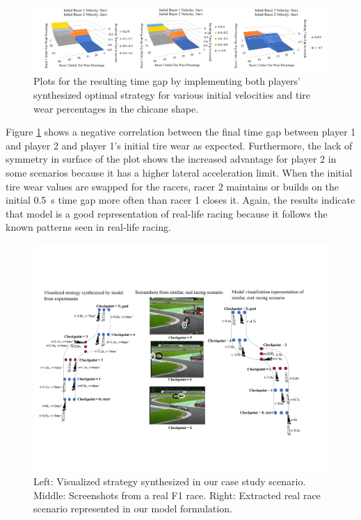  \begin{figure}[t!]
\includegraphics[width=\textwidth]{Figures/ChicaneExp.pdf}
    \caption[Results of scenarios in chicane case study.] {Plots for the resulting time gap by implementing both players' synthesized optimal strategy for various initial velocities and tire wear percentages in the chicane shape.}
    \label{fig:ch_exp}
\end{figure}
 
 Figure \ref{fig:ch_exp} shows a negative correlation between the final time gap between player 1 and player 2 and player 1's initial tire wear as expected. Furthermore, the lack of symmetry in surface of the plot shows the increased advantage for player 2 in some scenarios because it has a higher lateral acceleration limit. When the initial tire wear values are swapped for the racers, racer 2 maintains or builds on the initial \SI{0.5}{\second} time gap more often than racer 1 closes it. Again, the results indicate that model is a good representation of real-life racing because it follows the known patterns seen in real-life racing. 

\begin{figure}
\includegraphics[height=0.8\textwidth, width=\textheight]{Figures/ChicaneViz.pdf}
    \caption[Synthesized strategy compared to real-life scenario on a chicane.]{Left: Visualized strategy synthesized in our case study scenario. Middle: Screenshots from a real F1 race. Right: Extracted real race scenario represented in our model formulation.}
    \label{fig:ch}
\end{figure}

